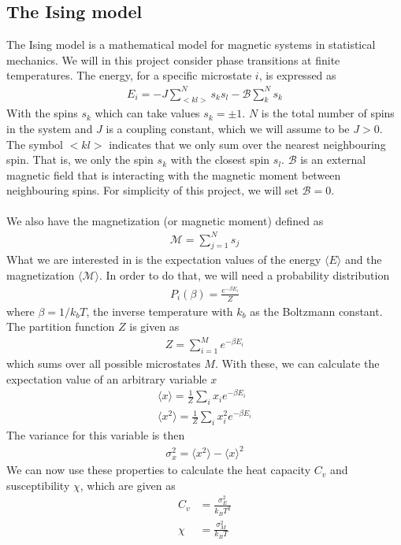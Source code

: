 \documentclass[12pt]{article}
\begin{document}
\subsection{The Ising model}
The Ising model is a mathematical model for magnetic systems in statistical mechanics. We will in this project consider phase transitions at finite temperatures. The energy, for a specific microstate $i$, is expressed as
\begin{align}
E_i = -J \displaystyle \sum^N_{< kl >}s_ks_l - \mathcal{B}\sum^N_k s_k
\label{eq:Energy_eq}
\end{align}
With the spins $s_k$ which can take values $s_k = \pm 1$. $N$ is the total number of spins in the system and $J$ is a coupling constant, which we will assume to be $J>0$. The symbol $< kl >$ indicates that we only sum over the nearest neighbouring spin. That is, we only the spin $s_k$ with the closest spin $s_l$. $\mathcal{B}$ is an external magnetic field that is interacting with the magnetic moment between neighbouring spins. For simplicity of this project, we will set $\mathcal{B} = 0$.\\\\
We also have the magnetization (or magnetic moment) defined as
\begin{align}
\mathcal{M} = \displaystyle \sum^N_{j=1} s_j
\label{eq:Magnetization}
\end{align}
What we are interested in is the expectation values of the energy $\langle E \rangle$ and the magnetization $\langle \mathcal{M} \rangle$. In order to do that, we will need a probability distribution
\begin{align}
P_i(\beta) = \frac{e^{-\beta E_i}}{Z}
\label{eq:Probability_dist}
\end{align}
where $\beta = 1/k_bT$, the inverse temperature with $k_b$ as the Boltzmann constant. The partition function $Z$ is given as
\begin{align}
Z = \displaystyle \sum_{i=1}^M e^{-\beta E_i}
\label{eq:Partition_func}
\end{align}
which sums over all possible microstates $M$. With these, we can calculate the expectation value of an arbitrary variable $x$
\begin{align*}
\langle x \rangle = \frac{1}{Z}\sum_i x_i e^{-\beta E_i} \\
\langle x^2 \rangle = \frac{1}{Z}\sum_i x_i^2 e^{-\beta E_i}
\end{align*} 
The variance for this variable is then
\begin{align*}
\sigma_x^2 = \langle x^2 \rangle - \langle x \rangle^2
\end{align*}
We can now use these properties to calculate the heat capacity $C_v$ and susceptibility $\chi$, which are given as
\begin{align*}
C_v &= \frac{\sigma_E^2}{k_BT^2} \\
\chi &= \frac{\sigma_M^2}{k_BT}
\end{align*}
\end{document}
